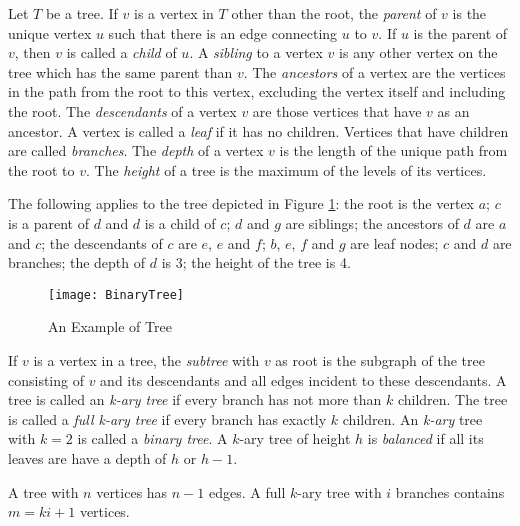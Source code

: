Let $T$ be a tree. If $v$ is a vertex in $T$ other than the root, the \emph{parent} of $v$ is the unique vertex $u$ such that there is an edge connecting $u$ to $v$. If $u$ is the parent of $v$, then $v$ is called a \emph{child} of $u$. A \emph{sibling} to a vertex $v$ is any other vertex on the tree which has the same parent than $v$. The \emph{ancestors} of a vertex are the vertices in the path from the root to this vertex, excluding the vertex itself and including the root. The \emph{descendants} of a vertex $v$ are those vertices that have $v$ as an ancestor. A vertex is called a \emph{leaf} if it has no children. Vertices that have children are called \emph{branches}. The \emph{depth} of a vertex $v$ is the length of the unique path from the root to $v$. The \emph{height} of a tree is the maximum of the levels of its vertices. 

\begin{example}
The following applies to the tree depicted in Figure \ref{fig:BinaryTree-Example}: the root is the vertex $a$; $c$ is a parent of $d$ and $d$ is a child of $c$; $d$ and $g$ are siblings; the ancestors of $d$ are $a$ and $c$; the descendants of $c$ are $e$, $e$ and $f$; $b$, $e$, $f$ and $g$ are leaf nodes; $c$ and $d$ are branches; the depth of $d$ is 3; the height of the tree is 4.
\end{example}

\begin{figure}[h]
\centering\texttt{[image: BinaryTree]}
\caption{\label{fig:BinaryTree-Example}An Example of Tree}
\end{figure}

If $v$ is a vertex in a tree, the \emph{subtree} with $v$ as root is the subgraph of the tree consisting of $v$ and its descendants and all edges incident to these descendants. A tree is called an \emph{k-ary tree} if every branch has not more than $k$ children. The tree is called a \emph{full k-ary tree} if every branch has exactly $k$ children. An \emph{k-ary} tree with $k=2$ is called a \emph{binary tree}. A $k$-ary tree of height $h$ is \emph{balanced} if all its leaves are have a depth of $h$ or $h-1$.

\begin{example}
A tree with $n$ vertices has $n-1$ edges. A full $k$-ary tree with $i$ branches contains $m=ki+1$ vertices.
\end{example}

